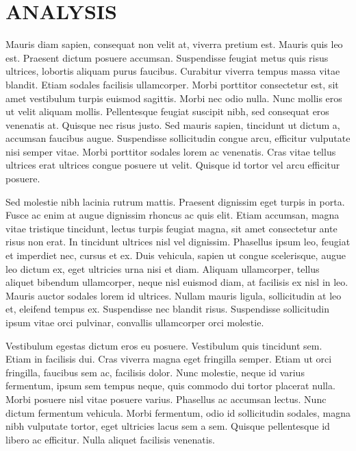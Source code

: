 \renewcommand{\chaptername}{}

\chapter{ANALYSIS}

Mauris diam sapien, consequat non velit at, viverra pretium est. Mauris quis leo est. Praesent dictum posuere accumsan. Suspendisse feugiat metus quis risus ultrices, lobortis aliquam purus faucibus. Curabitur viverra tempus massa vitae blandit. Etiam sodales facilisis ullamcorper. Morbi porttitor consectetur est, sit amet vestibulum turpis euismod sagittis. Morbi nec odio nulla. Nunc mollis eros ut velit aliquam mollis. Pellentesque feugiat suscipit nibh, sed consequat eros venenatis at. Quisque nec risus justo. Sed mauris sapien, tincidunt ut dictum a, accumsan faucibus augue. Suspendisse sollicitudin congue arcu, efficitur vulputate nisi semper vitae. Morbi porttitor sodales lorem ac venenatis. Cras vitae tellus ultrices erat ultrices congue posuere ut velit. Quisque id tortor vel arcu efficitur posuere.

Sed molestie nibh lacinia rutrum mattis. Praesent dignissim eget turpis in porta. Fusce ac enim at augue dignissim rhoncus ac quis elit. Etiam accumsan, magna vitae tristique tincidunt, lectus turpis feugiat magna, sit amet consectetur ante risus non erat. In tincidunt ultrices nisl vel dignissim. Phasellus ipsum leo, feugiat et imperdiet nec, cursus et ex. Duis vehicula, sapien ut congue scelerisque, augue leo dictum ex, eget ultricies urna nisi et diam. Aliquam ullamcorper, tellus aliquet bibendum ullamcorper, neque nisl euismod diam, at facilisis ex nisl in leo. Mauris auctor sodales lorem id ultrices. Nullam mauris ligula, sollicitudin at leo et, eleifend tempus ex. Suspendisse nec blandit risus. Suspendisse sollicitudin ipsum vitae orci pulvinar, convallis ullamcorper orci molestie.

Vestibulum egestas dictum eros eu posuere. Vestibulum quis tincidunt sem. Etiam in facilisis dui. Cras viverra magna eget fringilla semper. Etiam ut orci fringilla, faucibus sem ac, facilisis dolor. Nunc molestie, neque id varius fermentum, ipsum sem tempus neque, quis commodo dui tortor placerat nulla. Morbi posuere nisl vitae posuere varius. Phasellus ac accumsan lectus. Nunc dictum fermentum vehicula. Morbi fermentum, odio id sollicitudin sodales, magna nibh vulputate tortor, eget ultricies lacus sem a sem. Quisque pellentesque id libero ac efficitur. Nulla aliquet facilisis venenatis.


